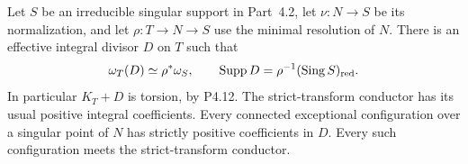 \begin{proposition}[P4R.6]\hypertarget{tag-02YI}{}\label{night:P4R.6}\label{stmt:P4R.6}


Let $S$ be an irreducible singular support in
Part~4.2, let $\nu:N\to S$ be its normalization,
and let $\rho:T\to N\to S$ use the minimal
resolution of $N$. There is an effective integral
divisor $D$ on $T$ such that
\[
 \omega_T(D)\simeq\rho^*\omega_S,
 \qquad \operatorname{Supp}D
       =\rho^{-1}(\operatorname{Sing}S)_{\rm red}.
\]
In particular $K_T+D$ is torsion, by P4.12.
The strict-transform conductor has its usual
positive integral coefficients. Every connected
exceptional configuration over a singular point
of $N$ has strictly positive coefficients in $D$.
Every such configuration meets the strict-transform
conductor.
\end{proposition}

